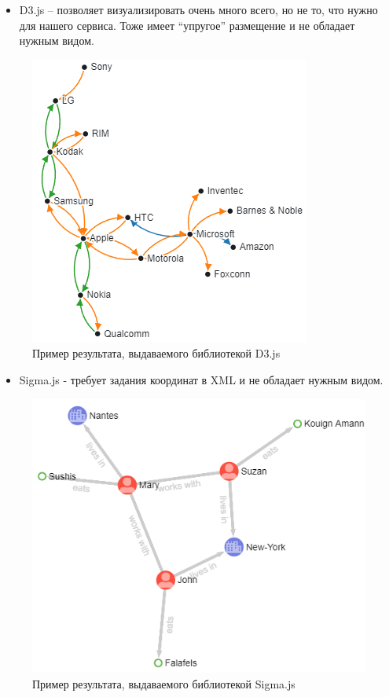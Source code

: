 \begin{itemize}
\item D3.js – позволяет визуализировать очень много всего, но не то, что нужно для нашего сервиса. Тоже имеет “упругое” размещение и не обладает нужным видом.
\end{itemize}
\begin{figure}[ht!] 
	\center
	\includegraphics [scale=0.27] {my_folder/images/my/17}
	\caption{Пример результата, выдаваемого библиотекой D3.js} 
	\label{fig:17}  
\end{figure}
\begin{itemize}
\item Sigma.js - требует задания координат в XML и не обладает нужным видом.
\end{itemize}
\begin{figure}[ht!] 
	\center
	\includegraphics [scale=0.27] {my_folder/images/my/18}
	\caption{Пример результата, выдаваемого библиотекой Sigma.js} 
	\label{fig:18}  
\end{figure}
